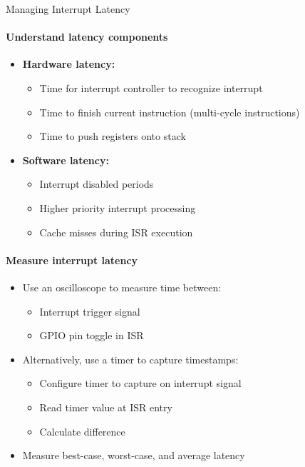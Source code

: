 \begin{KR}{Managing Interrupt Latency}
\paragraph{Understand latency components}
\begin{itemize}
    \item \textbf{Hardware latency:}
    \begin{itemize}
        \item Time for interrupt controller to recognize interrupt
        \item Time to finish current instruction (multi-cycle instructions)
        \item Time to push registers onto stack
    \end{itemize}
    \item \textbf{Software latency:}
    \begin{itemize}
        \item Interrupt disabled periods
        \item Higher priority interrupt processing
        \item Cache misses during ISR execution
    \end{itemize}
\end{itemize}

\paragraph{Measure interrupt latency}
\begin{itemize}
    \item Use an oscilloscope to measure time between:
    \begin{itemize}
        \item Interrupt trigger signal
        \item GPIO pin toggle in ISR
    \end{itemize}
    \item Alternatively, use a timer to capture timestamps:
    \begin{itemize}
        \item Configure timer to capture on interrupt signal
        \item Read timer value at ISR entry
        \item Calculate difference
    \end{itemize}
    \item Measure best-case, worst-case, and average latency
\end{itemize}


\end{KR}
